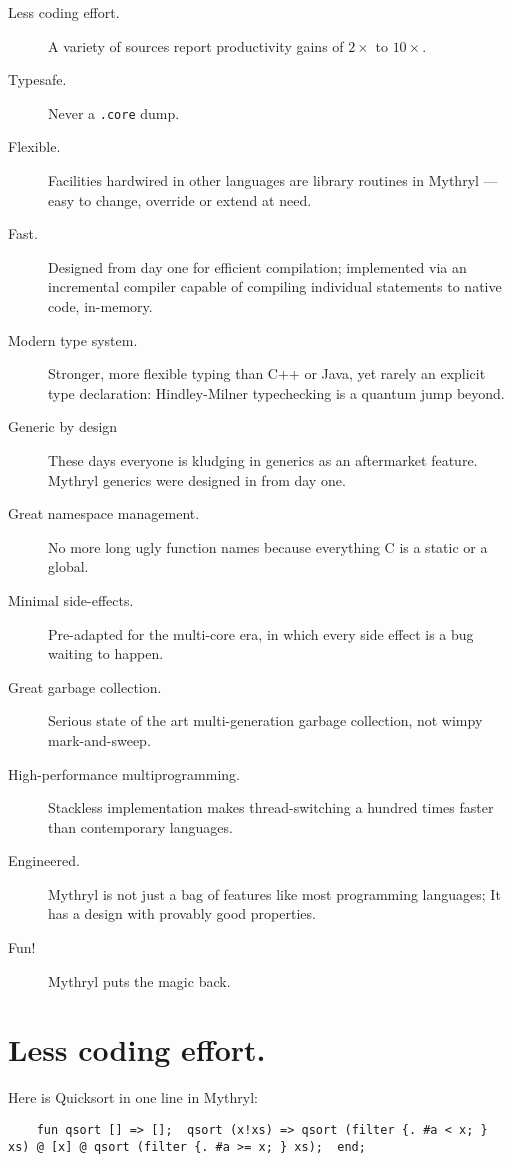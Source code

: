 \begin{description}
\item[Less coding effort.]  A variety of sources report productivity gains of $2\times$ to $10\times$.
\item[Typesafe.]  Never a \verb#.core# dump.
\item[Flexible.]  Facilities hardwired in other languages are library routines in Mythryl --- easy to change, override or extend at need.
\item[Fast.]  Designed from day one for efficient compilation;  implemented via an incremental compiler capable of compiling individual statements to native code, in-memory.
\item[Modern type system.] Stronger, more flexible typing than C++ or Java, yet rarely an explicit type declaration:  Hindley-Milner typechecking is a quantum jump beyond.
\item[Generic by design]  These days everyone is kludging in generics as an aftermarket feature.  Mythryl generics were designed in from day one.
\item[Great namespace management.]  No more long ugly function names because everything C is a static or a global.
\item[Minimal side-effects.]  Pre-adapted for the multi-core era, in which every side effect is a bug waiting to happen.
\item[Great garbage collection.]  Serious state of the art multi-generation garbage collection, not wimpy mark-and-sweep.
\item[High-performance multiprogramming.]  Stackless implementation makes thread-switching a hundred times faster than contemporary languages.
\item[Engineered.] Mythryl is not just a bag of features like most programming languages;  It has a design with provably good properties.
\item[Fun!]  Mythryl puts the magic back.
\end{description}


\section{Less coding effort.}

Here is Quicksort in one line in Mythryl:

\begin{verbatim}
    fun qsort [] => [];  qsort (x!xs) => qsort (filter {. #a < x; } xs) @ [x] @ qsort (filter {. #a >= x; } xs);  end;
\end{verbatim}


